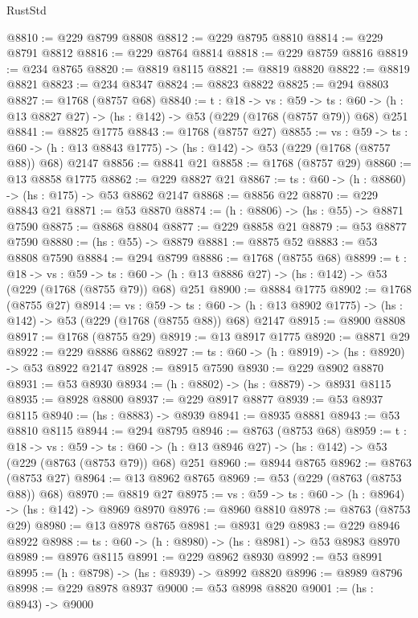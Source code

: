 \begin{lexlean}{RustStd}
\begin{coremodule}
@8810 := @229 @8799 @8808
@8812 := @229 @8795 @8810
@8814 := @229 @8791 @8812
@8816 := @229 @8764 @8814
@8818 := @229 @8759 @8816
@8819 := @234 @8765
@8820 := @8819 @8115
@8821 := @8819 @8820
@8822 := @8819 @8821
@8823 := @234 @8347
@8824 := @8823 @8822
@8825 := @294 @8803
@8827 := @1768 (@8757 @68)
@8840 := {t : @18} ->
  {vs : @59} ->
  {ts : @60} -> (h : @13 @8827 @27) -> (hs : @142) -> @53 (@229 (@1768 (@8757 @79)) @68) @251
@8841 := @8825 @1775
@8843 := @1768 (@8757 @27)
@8855 := {vs : @59} ->
  {ts : @60} -> (h : @13 @8843 @1775) -> (hs : @142) -> @53 (@229 (@1768 (@8757 @88)) @68) @2147
@8856 := @8841 @21
@8858 := @1768 (@8757 @29)
@8860 := @13 @8858 @1775
@8862 := @229 @8827 @21
@8867 := {ts : @60} -> (h : @8860) -> (hs : @175) -> @53 @8862 @2147
@8868 := @8856 @22
@8870 := @229 @8843 @21
@8871 := @53 @8870
@8874 := (h : @8806) -> (hs : @55) -> @8871 @7590
@8875 := @8868 @8804
@8877 := @229 @8858 @21
@8879 := @53 @8877 @7590
@8880 := (hs : @55) -> @8879
@8881 := @8875 @52
@8883 := @53 @8808 @7590
@8884 := @294 @8799
@8886 := @1768 (@8755 @68)
@8899 := {t : @18} ->
  {vs : @59} ->
  {ts : @60} -> (h : @13 @8886 @27) -> (hs : @142) -> @53 (@229 (@1768 (@8755 @79)) @68) @251
@8900 := @8884 @1775
@8902 := @1768 (@8755 @27)
@8914 := {vs : @59} ->
  {ts : @60} -> (h : @13 @8902 @1775) -> (hs : @142) -> @53 (@229 (@1768 (@8755 @88)) @68) @2147
@8915 := @8900 @8808
@8917 := @1768 (@8755 @29)
@8919 := @13 @8917 @1775
@8920 := @8871 @29
@8922 := @229 @8886 @8862
@8927 := {ts : @60} -> (h : @8919) -> (hs : @8920) -> @53 @8922 @2147
@8928 := @8915 @7590
@8930 := @229 @8902 @8870
@8931 := @53 @8930
@8934 := (h : @8802) -> (hs : @8879) -> @8931 @8115
@8935 := @8928 @8800
@8937 := @229 @8917 @8877
@8939 := @53 @8937 @8115
@8940 := (hs : @8883) -> @8939
@8941 := @8935 @8881
@8943 := @53 @8810 @8115
@8944 := @294 @8795
@8946 := @8763 (@8753 @68)
@8959 := {t : @18} ->
  {vs : @59} ->
  {ts : @60} -> (h : @13 @8946 @27) -> (hs : @142) -> @53 (@229 (@8763 (@8753 @79)) @68) @251
@8960 := @8944 @8765
@8962 := @8763 (@8753 @27)
@8964 := @13 @8962 @8765
@8969 := @53 (@229 (@8763 (@8753 @88)) @68)
@8970 := @8819 @27
@8975 := {vs : @59} -> {ts : @60} -> (h : @8964) -> (hs : @142) -> @8969 @8970
@8976 := @8960 @8810
@8978 := @8763 (@8753 @29)
@8980 := @13 @8978 @8765
@8981 := @8931 @29
@8983 := @229 @8946 @8922
@8988 := {ts : @60} -> (h : @8980) -> (hs : @8981) -> @53 @8983 @8970
@8989 := @8976 @8115
@8991 := @229 @8962 @8930
@8992 := @53 @8991
@8995 := (h : @8798) -> (hs : @8939) -> @8992 @8820
@8996 := @8989 @8796
@8998 := @229 @8978 @8937
@9000 := @53 @8998 @8820
@9001 := (hs : @8943) -> @9000

\end{coremodule}
\end{lexlean}
